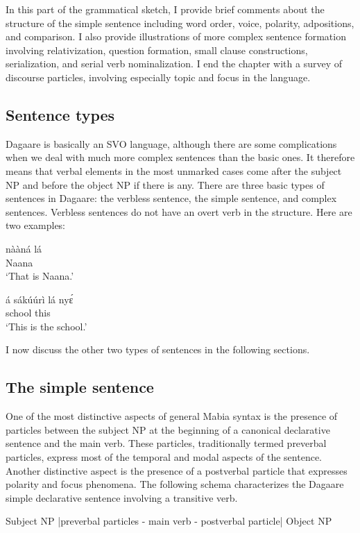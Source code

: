 In this part of the grammatical sketch, I provide brief comments about the structure of
the simple sentence including word order, voice, polarity, adpositions, and comparison. I also
provide illustrations of more complex sentence formation involving relativization, question
formation, small clause constructions, serialization, and serial verb nominalization. I end the
chapter with a survey of discourse particles, involving especially topic and focus in the
language.

\subsection{Sentence types}
Dagaare is basically an SVO language, although there are some complications when
we deal with much more complex sentences than the basic ones. It therefore means that
verbal elements in the most unmarked cases come after the subject NP and before the object
NP if there is any. There are three basic types of sentences in Dagaare: the verbless sentence,
the simple sentence, and complex sentences. Verbless sentences do not have an
overt verb in the structure. Here are two examples:

\ea \gll nààná lá\\
Naana {\FOC}\\
\glt ‘That is Naana.’\z 

\ea \gll á sákúúrì lá nyɛ́\\
{\DEF} school {\FOC} this\\
\glt ‘This is the school.’\z 

I now discuss the other two types of sentences in the following sections.

\subsection{The simple sentence}
One of the most distinctive aspects of general Mabia syntax is the presence of particles
between the subject NP at the beginning of a canonical declarative sentence and the main
verb. These particles, traditionally termed preverbal particles, express most of the temporal and modal aspects of the sentence. Another distinctive aspect is the presence of a
postverbal particle that expresses polarity and focus phenomena. The following schema
characterizes the Dagaare simple declarative sentence involving a transitive verb.

\ea  Subject NP |preverbal particles - main verb - postverbal particle| Object NP \z 

